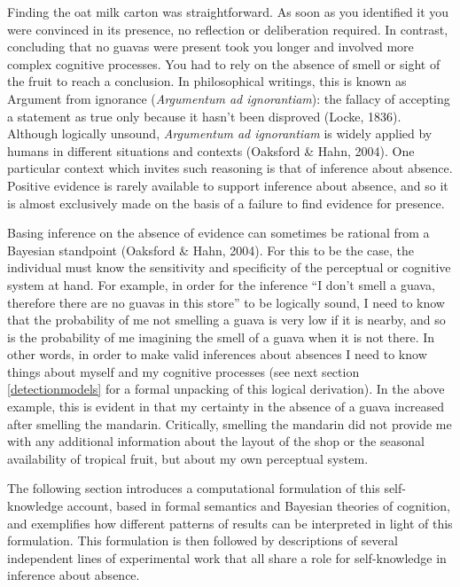 \documentclass[12pt,twoside]{reedthesis}
\begin{document}
Finding the oat milk carton was straightforward. As soon as you identified it you were convinced in its presence, no reflection or deliberation required. In contrast, concluding that no guavas were present took you longer and involved more complex cognitive processes. You had to rely on the absence of smell or sight of the fruit to reach a conclusion. In philosophical writings, this is known as Argument from ignorance (\emph{Argumentum ad ignorantiam}): the fallacy of accepting a statement as true only because it hasn't been disproved (Locke, 1836). Although logically unsound, \emph{Argumentum ad ignorantiam} is widely applied by humans in different situations and contexts (Oaksford \& Hahn, 2004). One particular context which invites such reasoning is that of inference about absence. Positive evidence is rarely available to support inference about absence, and so it is almost exclusively made on the basis of a failure to find evidence for presence.

Basing inference on the absence of evidence can sometimes be rational from a Bayesian standpoint (Oaksford \& Hahn, 2004). For this to be the case, the individual must know the sensitivity and specificity of the perceptual or cognitive system at hand. For example, in order for the inference ``I don't smell a guava, therefore there are no guavas in this store'' to be logically sound, I need to know that the probability of me not smelling a guava is very low if it is nearby, and so is the probability of me imagining the smell of a guava when it is not there. In other words, in order to make valid inferences about absences I need to know things about myself and my cognitive processes (see next section \ref{detectionmodels} for a formal unpacking of this logical derivation). In the above example, this is evident in that my certainty in the absence of a guava increased after smelling the mandarin. Critically, smelling the mandarin did not provide me with any additional information about the layout of the shop or the seasonal availability of tropical fruit, but about my own perceptual system.

The following section introduces a computational formulation of this self-knowledge account, based in formal semantics and Bayesian theories of cognition, and exemplifies how different patterns of results can be interpreted in light of this formulation. This formulation is then followed by descriptions of several independent lines of experimental work that all share a role for self-knowledge in inference about absence.
\end{document}
